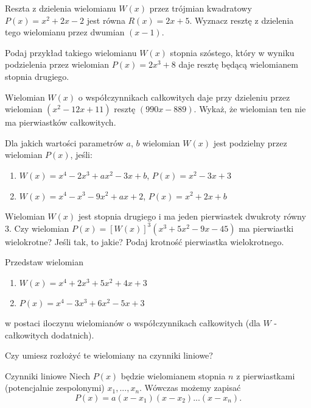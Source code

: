 \documentclass{article}
\begin{document}
\begin{zadanie}
  Reszta z dzielenia wielomianu $W(x)$ przez trójmian kwadratowy $P(x)=x^2+2x-2$ jest równa $R(x)=2x+5$. Wyznacz resztę z dzielenia tego wielomianu przez dwumian $(x-1)$.
\end{zadanie}

\begin{zadanie}
  Podaj przykład takiego wielomianu $W(x)$ stopnia szóstego, który w wyniku podzielenia przez wielomian $P(x)=2x^3+8$ daje resztę będącą wielomianem stopnia drugiego.
\end{zadanie}

\begin{zadanie}
  Wielomian $W(x)$ o współczynnikach całkowitych daje przy dzieleniu przez wielomian $(x^2-12x+11)$ resztę $(990x-889)$. Wykaż, że wielomian ten nie ma pierwiastków całkowitych.
\end{zadanie}

\begin{zadanie}
  Dla jakich wartości parametrów $a$, $b$ wielomian $W(x)$ jest podzielny przez wielomian $P(x)$, jeśli:
  \begin{enumerate}
    \item $W(x)=x^4-2x^3+ax^2-3x+b$, $P(x)=x^2-3x+3$
    \item $W(x)=x^4-x^3-9x^2+ax+2$, $P(x)=x^2+2x+b$
  \end{enumerate}
\end{zadanie}

\begin{zadanie}
  Wielomian $W(x)$ jest stopnia drugiego i ma jeden pierwiastek dwukroty równy $3$. Czy wielomian $P(x)=[W(x)]^3(x^3+5x^2-9x-45)$ ma pierwiastki wielokrotne? Jeśli tak, to jakie? Podaj krotność pierwiastka wielokrotnego.
\end{zadanie}

\begin{zadanie}
  Przedstaw wielomian 
  \begin{enumerate}
    \item $W(x)=x^4+2x^3+5x^2+4x+3$ 
    \item $P(x)=x^4-3x^3+6x^2-5x+3$
  \end{enumerate}
  w postaci iloczynu wielomianów o współczynnikach całkowitych (dla $W$ - całkowitych dodatnich). 

  Czy umiesz rozłożyć te wielomiany na czynniki liniowe?
\end{zadanie}

\begin{mybox}{Czynniki liniowe}
  Niech $P(x)$ będzie wielomianem stopnia $n$ z pierwiastkami (potencjalnie zespolonymi) $x_1,...,x_n$. Wówczas możemy zapisać
  $$P(x)=a(x-x_1)(x-x_2)...(x-x_n).$$
\end{mybox}
\end{document}
